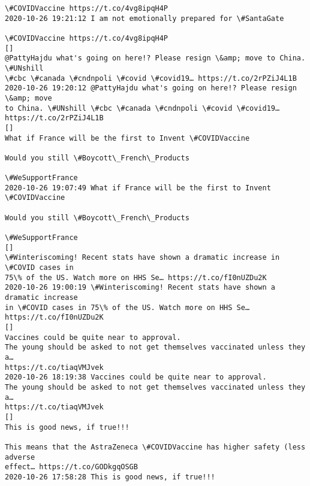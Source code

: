 \documentclass[11pt]{article}
\begin{document}
\begin{Verbatim}[commandchars=\\\{\}]
\#COVIDVaccine https://t.co/4vg8ipqH4P
2020-10-26 19:21:12 I am not emotionally prepared for \#SantaGate

\#COVIDVaccine https://t.co/4vg8ipqH4P
[]
@PattyHajdu what's going on here!? Please resign \&amp; move to China. \#UNshill
\#cbc \#canada \#cndnpoli \#covid \#covid19… https://t.co/2rPZiJ4L1B
2020-10-26 19:20:12 @PattyHajdu what's going on here!? Please resign \&amp; move
to China. \#UNshill \#cbc \#canada \#cndnpoli \#covid \#covid19…
https://t.co/2rPZiJ4L1B
[]
What if France will be the first to Invent \#COVIDVaccine

Would you still \#Boycott\_French\_Products

\#WeSupportFrance
2020-10-26 19:07:49 What if France will be the first to Invent \#COVIDVaccine

Would you still \#Boycott\_French\_Products

\#WeSupportFrance
[]
\#Winteriscoming! Recent stats have shown a dramatic increase in \#COVID cases in
75\% of the US. Watch more on HHS Se… https://t.co/fI0nUZDu2K
2020-10-26 19:00:19 \#Winteriscoming! Recent stats have shown a dramatic increase
in \#COVID cases in 75\% of the US. Watch more on HHS Se… https://t.co/fI0nUZDu2K
[]
Vaccines could be quite near to approval.
The young should be asked to not get themselves vaccinated unless they a…
https://t.co/tiaqVMJvek
2020-10-26 18:19:38 Vaccines could be quite near to approval.
The young should be asked to not get themselves vaccinated unless they a…
https://t.co/tiaqVMJvek
[]
This is good news, if true!!!

This means that the AstraZeneca \#COVIDVaccine has higher safety (less adverse
effect… https://t.co/GODkgqOSGB
2020-10-26 17:58:28 This is good news, if true!!!


\end{Verbatim}
\end{document}

